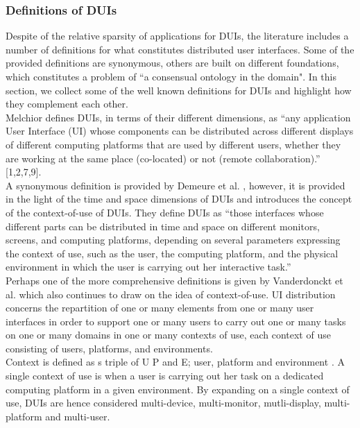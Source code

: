 \subsubsection{Definitions of DUIs}
Despite of the relative sparsity of applications for DUIs, the literature
includes a number of definitions for what constitutes distributed user interfaces. Some of the provided definitions are synonymous, others are
built on different foundations, which constitutes a problem of ``a consensual
ontology in the domain"\cite{vanderdonckt2010distributed}. In this section, we
collect some of the well known definitions for DUIs and highlight how they
complement each other.\\
Melchior \cite{melchior2011distributed} defines DUIs, in terms of their
different dimensions, as ``any application User Interface (UI) whose components
can be distributed across different displays of different computing platforms that are used by different users, whether they are working at the same place (co-located) or not (remote collaboration).'' [1,2,7,9].\\
A synonymous definition is provided by Demeure et al. \cite{demeure20084c},
however, it is provided in the light of the time and space dimensions of DUIs
and introduces the concept of the context-of-use of DUIs.
They define DUIs as ``those interfaces whose different parts can be distributed in time and space on different monitors, screens, and computing platforms, depending on several parameters expressing the context of use, such as the user, the computing platform, and the physical environment in which the user is carrying out her interactive task.'' \\ 
Perhaps one of the more comprehensive definitions is given by Vanderdonckt et
al. \cite{vanderdonckt2010distributed} which also continues to draw on the idea of context-of-use. UI distribution
concerns the repartition of one or many elements from one or many user interfaces in order to support one or many users to carry out one or many tasks on one or many domains in one or many contexts of use, each context of use consisting of users, platforms, and environments.\\
Context is defined as s triple of U P and E; user, platform and
environment \cite{vanderdonckt2010distributed}. A single context of
use is when a user is carrying out her task on a dedicated computing platform in
a given environment. By expanding on a single context of use, DUIs are hence
considered  multi-device, multi-monitor, mutli-display,
multi-platform and multi-user. \cite{vanderdonckt2010distributed}\\
